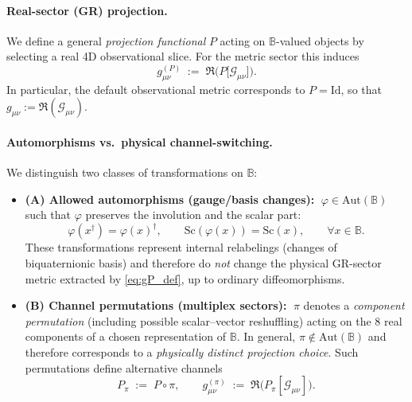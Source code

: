 \paragraph{Real-sector (GR) projection.}
We define a general \emph{projection functional} $P$ acting on $\mathbb{B}$-valued objects by selecting a real 4D observational slice.
For the metric sector this induces
\begin{equation}
g^{(P)}_{\mu\nu} \;:=\; \Re\!\Big(P\big[\mathcal{G}_{\mu\nu}\big]\Big).
\label{eq:gP_def}
\end{equation}
In particular, the default observational metric corresponds to $P=\mathrm{Id}$,
so that $g_{\mu\nu} := \Re(\mathcal{G}_{\mu\nu})$.

\paragraph{Automorphisms vs.\ physical channel-switching.}
We distinguish two classes of transformations on $\mathbb{B}$:

\begin{itemize}
\item \textbf{(A) Allowed automorphisms (gauge/basis changes):}
$\;\varphi\in\mathrm{Aut}(\mathbb{B})$ such that $\varphi$ preserves the involution and the scalar part:
\begin{equation}
\varphi(x^\dagger)=\varphi(x)^\dagger,\qquad \mathrm{Sc}(\varphi(x))=\mathrm{Sc}(x),
\qquad \forall x\in\mathbb{B}.
\label{eq:aut_conditions}
\end{equation}
These transformations represent internal relabelings (changes of biquaternionic basis)
and therefore do \emph{not} change the physical GR-sector metric extracted by \eqref{eq:gP_def},
up to ordinary diffeomorphisms.

\item \textbf{(B) Channel permutations (multiplex sectors):}
$\;\pi$ denotes a \emph{component permutation} (including possible scalar--vector reshuffling)
acting on the 8 real components of a chosen representation of $\mathbb{B}$.
In general, $\pi\notin\mathrm{Aut}(\mathbb{B})$ and therefore corresponds to a \emph{physically distinct projection choice}.
Such permutations define alternative channels
\begin{equation}
P_\pi \;:=\; P\circ \pi,
\qquad
g^{(\pi)}_{\mu\nu} \;:=\; \Re\!\Big(P_\pi[\mathcal{G}_{\mu\nu}]\Big).
\label{eq:pi_channel_def}
\end{equation}
\end{itemize}

